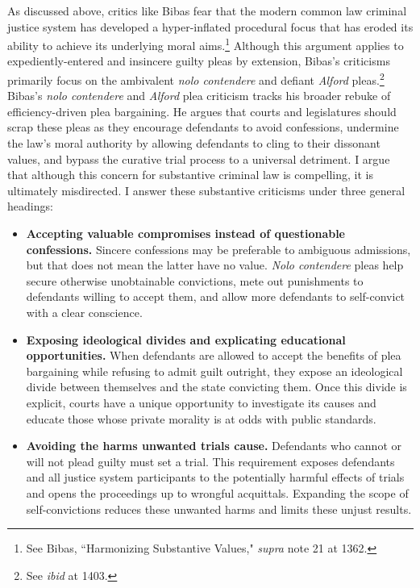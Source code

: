 As discussed above, critics like Bibas fear that the modern common law criminal justice system has developed a hyper-inflated procedural focus that has eroded its ability to achieve its underlying moral aims.\footnote{See Bibas, ``Harmonizing Substantive Values," \textit{supra} note 21 at 1362.} Although this argument applies to expediently-entered and insincere guilty pleas by extension, Bibas's criticisms primarily focus on the ambivalent \textit{nolo contendere} and defiant \textit{Alford} pleas.\footnote{See \textit{ibid} at 1403.} Bibas's \textit{nolo contendere} and \textit{Alford} plea criticism tracks his broader rebuke of efficiency-driven plea bargaining. He argues that courts and legislatures should scrap these pleas as they encourage defendants to avoid confessions, undermine the law's moral authority by allowing defendants to cling to their dissonant values, and bypass the curative trial process to a universal detriment. I argue that although this concern for substantive criminal law is compelling, it is ultimately misdirected. I answer these substantive criticisms under three general headings:

\begin{itemize}
    \item \textbf{Accepting valuable compromises instead of questionable confessions.} Sincere confessions may be preferable to ambiguous admissions, but that does not mean the latter have no value. \textit{Nolo contendere} pleas help secure otherwise unobtainable convictions, mete out punishments to defendants willing to accept them, and allow more defendants to self-convict with a clear conscience.
    \item \textbf{Exposing ideological divides and explicating educational opportunities.} When defendants are allowed to accept the benefits of plea bargaining while refusing to admit guilt outright, they expose an ideological divide between themselves and the state convicting them. Once this divide is explicit, courts have a unique opportunity to investigate its causes and educate those whose private morality is at odds with public standards.
    \item \textbf{Avoiding the harms unwanted trials cause.} Defendants who cannot or will not plead guilty must set a trial. This requirement exposes defendants and all justice system participants to the potentially harmful effects of trials and opens the proceedings up to wrongful acquittals. Expanding the scope of self-convictions reduces these unwanted harms and limits these unjust results.
\end{itemize}

